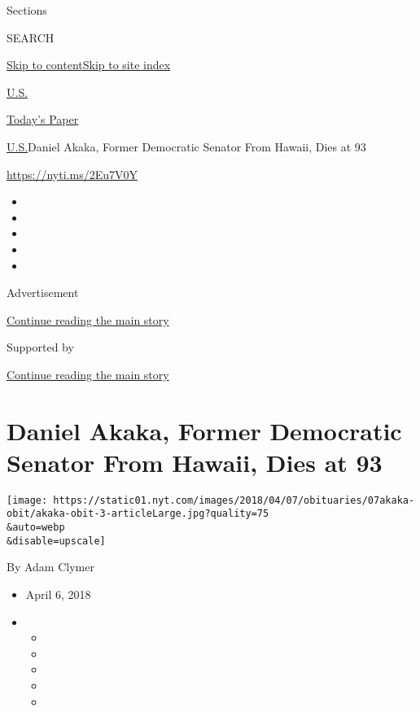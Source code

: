 Sections

SEARCH

\protect\hyperlink{site-content}{Skip to
content}\protect\hyperlink{site-index}{Skip to site index}

\href{https://www.nytimes.com/section/us}{U.S.}

\href{https://myaccount.nytimes.com/auth/login?response_type=cookie\&client_id=vi}{}

\href{https://www.nytimes.com/section/todayspaper}{Today's Paper}

\href{/section/us}{U.S.}\textbar{}Daniel Akaka, Former Democratic
Senator From Hawaii, Dies at 93

\url{https://nyti.ms/2Eu7V0Y}

\begin{itemize}
\item
\item
\item
\item
\item
\end{itemize}

Advertisement

\protect\hyperlink{after-top}{Continue reading the main story}

Supported by

\protect\hyperlink{after-sponsor}{Continue reading the main story}

\hypertarget{daniel-akaka-former-democratic-senator-from-hawaii-dies-at-93}{%
\section{Daniel Akaka, Former Democratic Senator From Hawaii, Dies at
93}\label{daniel-akaka-former-democratic-senator-from-hawaii-dies-at-93}}

\texttt{[image: https://static01.nyt.com/images/2018/04/07/obituaries/07akaka-obit/akaka-obit-3-articleLarge.jpg?quality=75\\\&auto=webp\\\&disable=upscale]}

By Adam Clymer

\begin{itemize}
\item
  April 6, 2018
\item
  \begin{itemize}
  \item
  \item
  \item
  \item
  \item
  \end{itemize}
\end{itemize}

